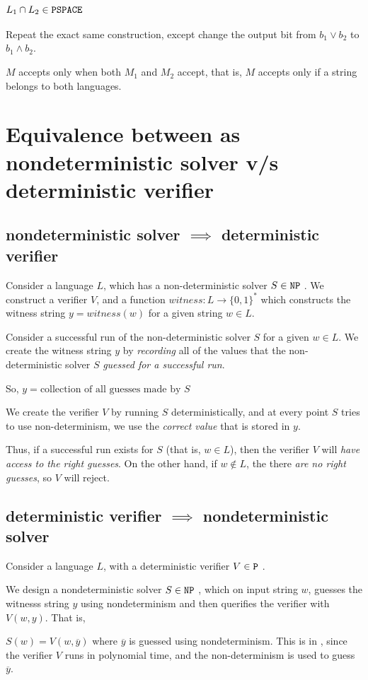 \documentclass{article}
\begin{document}
\subsection{$L_1 \cap L_2 \in \texttt{PSPACE}~$}
Repeat the exact same construction, except change the output bit from
$b_1 \lor b_2$ to $b_1 \land b_2$.

$M$ accepts only when both $M_1$ and $M_2$ accept, that is, $M$ accepts
only if a string belongs to both languages.



\section{Equivalence between \np as nondeterministic solver v/s deterministic verifier}
\subsection{nondeterministic solver $\implies$ deterministic verifier}
Consider a language $L$, which has a non-deterministic solver $S \in \texttt{NP}~$.
We construct a verifier $V$, and a function $witness: L \to \{0, 1\}^*$ which
constructs the witness string $y = witness(w)$ for a given string $w \in L$.

Consider a successful run of the non-deterministic solver $S$ for a
given $w \in L$. We create the witness string $y$ by \textit{recording} all of the
values that the non-deterministic solver $S$ \textit{guessed for a successful run}.

So, $y = \text{collection of all guesses made by $S$}$

We create the verifier $V$ by running $S$ deterministically, and at every 
point $S$ tries to use non-determinism, we use the \textit{correct value}
that is stored in $y$. 

Thus, if a successful run exists for $S$ (that is, $w \in L$),
then the verifier $V$ will \textit{have access to the right guesses}.  On the other hand,
if $w \notin L$, the there \textit{are no right guesses}, so $V$ will reject.



\subsection{deterministic verifier $\implies$ nondeterministic solver}
Consider a language $L$, with a deterministic verifier $V \in \texttt{P}~$.

We design a nondeterministic solver $S \in \texttt{NP}~$, which on input string
$w$, guesses the witnesss string $y$ using nondeterminism and
then querifies the verifier with $V(w, y)$. That is,

$S(w) = V(w, \overline{y})$ where $\overline{y}$ is guessed using
nondeterminism.  This is in \np, since the verifier $V$ runs in polynomial
time, and the non-determinism is used to guess $\overline{y}$.
\end{document}
